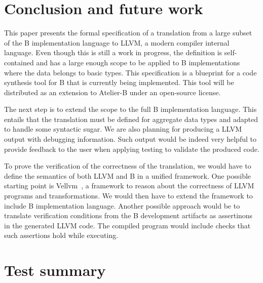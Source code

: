 \documentclass{llncs}
\begin{document}
\begin{enumerate}
\section{Conclusion and future work}
\label{sec:conclusion}

This paper presents the formal specification of a translation from a large
subset of the B implementation language to LLVM, a modern compiler internal
language.  Even though this is still a work in progress, the definition is
self-contained and has a large enough scope to be applied to B implementations
where the data belongs to basic types. This specification is a blueprint for a
code synthesis tool for B that is currently being implemented. This tool will be
distributed as an extension to Atelier-B under an open-source license.

The next step is to extend the scope to the full B implementation language. This
entails that the translation must be defined for aggregate data types and
adapted to handle some syntactic sugar. We are also planning for producing a
LLVM output with debugging information. Such output would be indeed very helpful
to provide feedback to the user when applying testing to validate the produced
code.

To prove the verification of the correctness of the translation, we would have
to define the semantics of both LLVM and B in a unified framework. One possible
starting point is Vellvm~\cite{vellvm}, a framework to reason about the
correctness of LLVM programs and transformations. We would then have to extend
the framework to include B implementation language. Another possible approach
would be to translate verification conditions from the B development artifacts
as assertinons in the generated LLVM code. The compiled program would include
checks that such assertions hold while executing.




\newpage
\appendix

\section{Test summary}


\end{enumerate}
\end{document}
